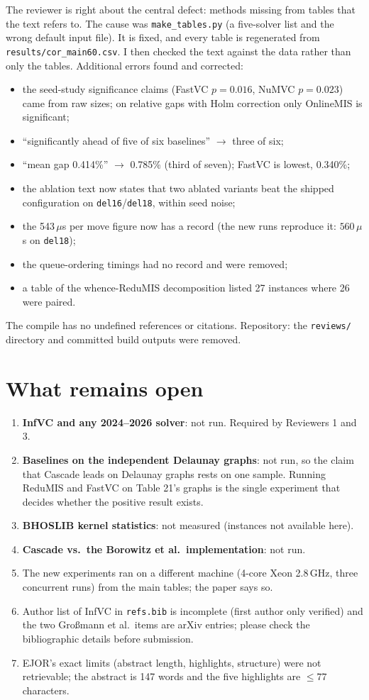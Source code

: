 \documentclass[11pt]{article}
\begin{document}
The reviewer is right about the central defect: methods missing from tables that
the text refers to. The cause was \texttt{make\_tables.py} (a five-solver list and
the wrong default input file). It is fixed, and every table is regenerated from
\texttt{results/cor\_main60.csv}. I then checked the text against the data rather
than only the tables. Additional errors found and corrected:
\begin{itemize}
\item the seed-study significance claims (FastVC $p=0.016$, NuMVC $p=0.023$) came
  from raw sizes; on relative gaps with Holm correction only OnlineMIS is
  significant;
\item ``significantly ahead of five of six baselines'' $\to$ three of six;
\item ``mean gap 0.414\%'' $\to$ 0.785\% (third of seven); FastVC is lowest, 0.340\%;
\item the ablation text now states that two ablated variants beat the shipped
  configuration on \texttt{del16}/\texttt{del18}, within seed noise;
\item the 543\,$\mu$s per move figure now has a record (the new runs reproduce it:
  $560\,\mu$s on \texttt{del18});
\item the queue-ordering timings had no record and were removed;
\item a table of the whence-ReduMIS decomposition listed 27 instances where 26
  were paired.
\end{itemize}
The compile has no undefined references or citations. Repository: the
\texttt{reviews/} directory and committed build outputs were removed.

\section*{What remains open}
\begin{enumerate}
\item \textbf{InfVC and any 2024--2026 solver}: not run. Required by Reviewers 1 and 3.
\item \textbf{Baselines on the independent Delaunay graphs}: not run, so the claim
  that Cascade leads on Delaunay graphs rests on one sample. Running ReduMIS and
  FastVC on Table 21's graphs is the single experiment that decides whether the
  positive result exists.
\item \textbf{BHOSLIB kernel statistics}: not measured (instances not available
  here).
\item \textbf{Cascade vs.\ the Borowitz et al.\ implementation}: not run.
\item The new experiments ran on a different machine (4-core Xeon 2.8\,GHz,
  three concurrent runs) from the main tables; the paper says so.
\item Author list of InfVC in \texttt{refs.bib} is incomplete (first author only
  verified) and the two Gro{\ss}mann et al.\ items are arXiv entries; please
  check the bibliographic details before submission.
\item EJOR's exact limits (abstract length, highlights, structure) were not
  retrievable; the abstract is 147 words and the five highlights are
  $\le 77$ characters.
\end{enumerate}
\end{document}
